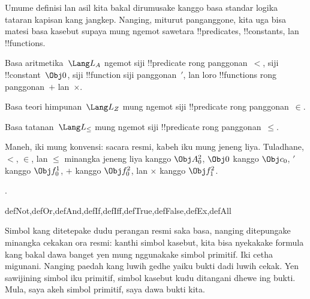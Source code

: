 \documentclass[../../../include/open-logic-section]{subfiles}
\begin{document}
Umume definisi lan asil kita bakal dirumusake kanggo basa standar
logika tataran kapisan kang jangkep. Nanging, miturut panganggone, kita uga
bisa matesi basa kasebut supaya mung ngemot sawetara !!{predicate}s,
!!{constant}s, lan !!{function}s.

\begin{ex}
Basa aritmetika~$\Lang L_A$ ngemot siji !!{predicate} rong panggonan~$<$,
siji !!{constant}~$\Obj 0$, siji !!{function} siji panggonan~$\prime$,
lan loro !!{function}s rong panggonan~$+$ lan~$\times$.
\end{ex}

\begin{ex}
Basa teori himpunan~$\Lang L_Z$ mung ngemot siji !!{predicate} rong
panggonan~$\in$.
\end{ex}

\begin{ex}
Basa tatanan~$\Lang L_\le$ mung ngemot siji !!{predicate} rong
panggonan~$\le$.
\end{ex}

Maneh, iki mung konvensi: sacara resmi, kabeh iku mung jeneng liya.
Tuladhane, $<$, $\in$, lan $\le$ minangka jeneng liya kanggo $\Obj A^2_0$,
$\Obj 0$ kanggo $\Obj c_0$, $\prime$ kanggo $\Obj f^1_0$, $+$ kanggo
$\Obj f^2_0$, lan $\times$ kanggo $\Obj f^2_1$.

.

\begin{tagblock}{defNot,defOr,defAnd,defIf,defIff,defTrue,defFalse,defEx,defAll}
\begin{explain}
Simbol kang ditetepake dudu perangan resmi saka basa, nanging
ditepungake minangka cekakan ora resmi: kanthi simbol kasebut, kita
bisa nyekakake formula kang bakal dawa banget yen mung nggunakake
simbol primitif. Iki cetha migunani. Nanging paedah kang luwih gedhe
yaiku bukti dadi luwih cekak. Yen sawijining simbol iku primitif,
simbol kasebut kudu ditangani dhewe ing bukti. Mula, saya akeh simbol
primitif, saya dawa bukti kita.
\end{explain}
\end{tagblock}
\end{document}
